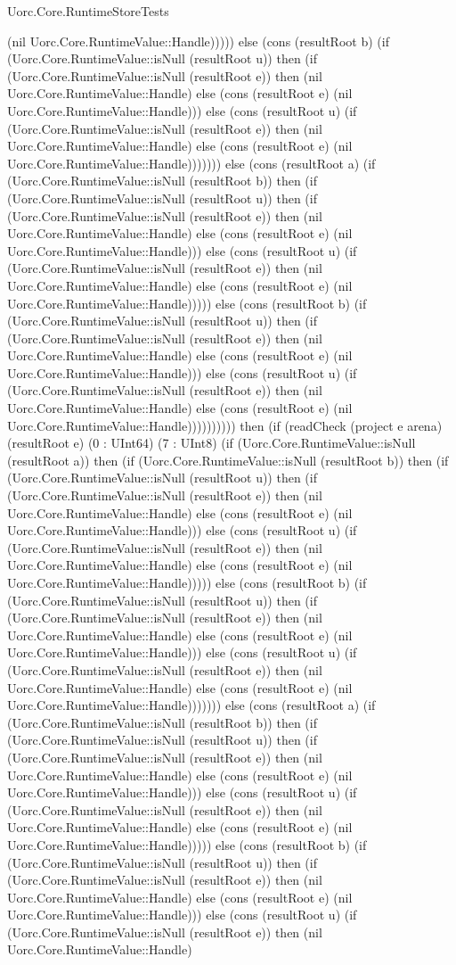 \begin{lexlean}{Uorc.Core.RuntimeStoreTests}
\begin{semanticmodule}
{(nil Uorc.Core.RuntimeValue::Handle))))) else (cons (resultRoot b) (if (Uorc.Core.RuntimeValue::isNull (resultRoot u)) then (if (Uorc.Core.RuntimeValue::isNull (resultRoot e)) then (nil Uorc.Core.RuntimeValue::Handle) else (cons (resultRoot e) (nil Uorc.Core.RuntimeValue::Handle))) else (cons (resultRoot u) (if (Uorc.Core.RuntimeValue::isNull (resultRoot e)) then (nil Uorc.Core.RuntimeValue::Handle) else (cons (resultRoot e) (nil Uorc.Core.RuntimeValue::Handle))))))) else (cons (resultRoot a) (if (Uorc.Core.RuntimeValue::isNull (resultRoot b)) then (if (Uorc.Core.RuntimeValue::isNull (resultRoot u)) then (if (Uorc.Core.RuntimeValue::isNull (resultRoot e)) then (nil Uorc.Core.RuntimeValue::Handle) else (cons (resultRoot e) (nil Uorc.Core.RuntimeValue::Handle))) else (cons (resultRoot u) (if (Uorc.Core.RuntimeValue::isNull (resultRoot e)) then (nil Uorc.Core.RuntimeValue::Handle) else (cons (resultRoot e) (nil Uorc.Core.RuntimeValue::Handle))))) else (cons (resultRoot b) (if (Uorc.Core.RuntimeValue::isNull (resultRoot u)) then (if (Uorc.Core.RuntimeValue::isNull (resultRoot e)) then (nil Uorc.Core.RuntimeValue::Handle) else (cons (resultRoot e) (nil Uorc.Core.RuntimeValue::Handle))) else (cons (resultRoot u) (if (Uorc.Core.RuntimeValue::isNull (resultRoot e)) then (nil Uorc.Core.RuntimeValue::Handle) else (cons (resultRoot e) (nil Uorc.Core.RuntimeValue::Handle)))))))))) then (if (readCheck (project e arena) (resultRoot e) (0 : UInt64) (7 : UInt8) (if (Uorc.Core.RuntimeValue::isNull (resultRoot a)) then (if (Uorc.Core.RuntimeValue::isNull (resultRoot b)) then (if (Uorc.Core.RuntimeValue::isNull (resultRoot u)) then (if (Uorc.Core.RuntimeValue::isNull (resultRoot e)) then (nil Uorc.Core.RuntimeValue::Handle) else (cons (resultRoot e) (nil Uorc.Core.RuntimeValue::Handle))) else (cons (resultRoot u) (if (Uorc.Core.RuntimeValue::isNull (resultRoot e)) then (nil Uorc.Core.RuntimeValue::Handle) else (cons (resultRoot e) (nil Uorc.Core.RuntimeValue::Handle))))) else (cons (resultRoot b) (if (Uorc.Core.RuntimeValue::isNull (resultRoot u)) then (if (Uorc.Core.RuntimeValue::isNull (resultRoot e)) then (nil Uorc.Core.RuntimeValue::Handle) else (cons (resultRoot e) (nil Uorc.Core.RuntimeValue::Handle))) else (cons (resultRoot u) (if (Uorc.Core.RuntimeValue::isNull (resultRoot e)) then (nil Uorc.Core.RuntimeValue::Handle) else (cons (resultRoot e) (nil Uorc.Core.RuntimeValue::Handle))))))) else (cons (resultRoot a) (if (Uorc.Core.RuntimeValue::isNull (resultRoot b)) then (if (Uorc.Core.RuntimeValue::isNull (resultRoot u)) then (if (Uorc.Core.RuntimeValue::isNull (resultRoot e)) then (nil Uorc.Core.RuntimeValue::Handle) else (cons (resultRoot e) (nil Uorc.Core.RuntimeValue::Handle))) else (cons (resultRoot u) (if (Uorc.Core.RuntimeValue::isNull (resultRoot e)) then (nil Uorc.Core.RuntimeValue::Handle) else (cons (resultRoot e) (nil Uorc.Core.RuntimeValue::Handle))))) else (cons (resultRoot b) (if (Uorc.Core.RuntimeValue::isNull (resultRoot u)) then (if (Uorc.Core.RuntimeValue::isNull (resultRoot e)) then (nil Uorc.Core.RuntimeValue::Handle) else (cons (resultRoot e) (nil Uorc.Core.RuntimeValue::Handle))) else (cons (resultRoot u) (if (Uorc.Core.RuntimeValue::isNull (resultRoot e)) then (nil Uorc.Core.RuntimeValue::Handle) }
\end{semanticmodule}
\end{lexlean}
